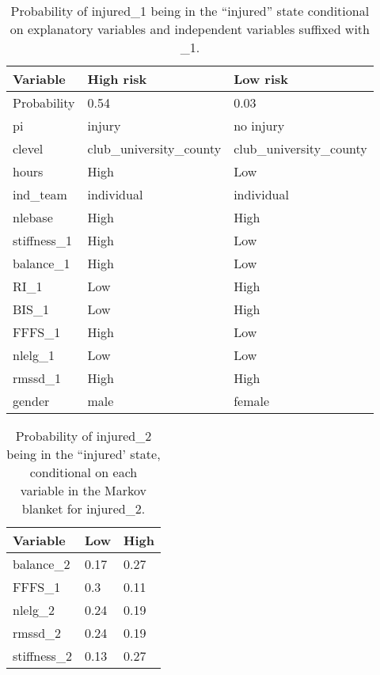 \documentclass[
]{frontiersHLTH}
\begin{document}
\begin{table}[H]

\caption{\label{tab:table7}Probability of injured\_1 being in the ``injured'' state conditional on explanatory variables and independent variables suffixed with \_1.}
\centering
\begin{tabular}[t]{l|l|l}
\hline
\textbf{Variable} & \textbf{High risk} & \textbf{Low risk}\\
\hline
Probability & 0.54 & 0.03\\
\hline
pi & injury & no injury\\
\hline
clevel & club\_university\_county & club\_university\_county\\
\hline
hours & High & Low\\
\hline
ind\_team & individual & individual\\
\hline
nlebase & High & High\\
\hline
stiffness\_1 & High & Low\\
\hline
balance\_1 & High & Low\\
\hline
RI\_1 & Low & High\\
\hline
BIS\_1 & Low & High\\
\hline
FFFS\_1 & High & Low\\
\hline
nlelg\_1 & Low & Low\\
\hline
rmssd\_1 & High & High\\
\hline
gender & male & female\\
\hline
\end{tabular}
\end{table}

\begin{table}[H]

\caption{\label{tab:table8}Probability of injured\_2 being in the ``injured' state, conditional on each variable in the Markov blanket for injured\_2.}
\centering
\begin{tabular}[t]{l|l|l}
\hline
\textbf{Variable} & \textbf{Low} & \textbf{High}\\
\hline
balance\_2 & 0.17 & 0.27\\
\hline
FFFS\_1 & 0.3 & 0.11\\
\hline
nlelg\_2 & 0.24 & 0.19\\
\hline
rmssd\_2 & 0.24 & 0.19\\
\hline
stiffness\_2 & 0.13 & 0.27\\
\hline
\end{tabular}
\end{table}
\end{document}
